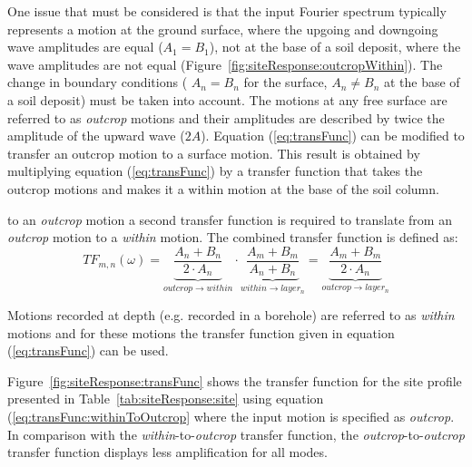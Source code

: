 \documentclass[11pt]{report}
\begin{document}
One issue that must be considered is that the input Fourier spectrum typically represents a motion
at the ground surface, where the upgoing and downgoing wave amplitudes are equal ($A_1=B_1$), not at
the base of a soil deposit, where the wave amplitudes are not equal
(Figure~\ref{fig:siteResponse:outcropWithin}). The change in boundary conditions ( $A_n = B_n$ for
the surface, $A_n \ne B_n$ at the base of a soil deposit) must be taken into account.  The motions
at any free surface are referred to as \emph{outcrop} motions and their
amplitudes are described by twice the amplitude of the upward wave ($2A$).  Equation
(\ref{eq:transFunc}) can be modified to transfer an outcrop motion to a surface motion.  This result
is obtained by multiplying equation (\ref{eq:transFunc}) by a transfer function that takes the
outcrop motions and makes it a within motion at the base of the soil column.

to an \emph{outcrop} motion a second transfer function is required to translate
from an \emph{outcrop} motion to a \emph{within} motion.  The combined transfer function is defined
as:
\begin{equation}
  TF_{m,n}(\omega) = \underbrace{\frac{A_n + B_n}{2\cdot A_n}}_{outcrop \to within} \cdot
  \underbrace{\frac{A_m + B_m}{A_n + B_n}}_{within \to layer_n} = \underbrace{\frac{A_m + B_m}{ 2
  \cdot A_n }}_{outcrop \to layer_n}
  \label{eq:transFunc:withinToOutcrop}
\end{equation}

Motions recorded at depth (e.g. recorded in a borehole) are referred to as
\emph{within} motions and for these motions the transfer function given in
equation (\ref{eq:transFunc}) can be used.  

Figure~\ref{fig:siteResponse:transFunc} shows the transfer function for the site profile presented
in Table~\ref{tab:siteResponse:site} using equation (\ref{eq:transFunc:withinToOutcrop} where the
input motion is specified as \emph{outcrop}. In comparison with the \emph{within}-to-\emph{outcrop}
transfer function, the \emph{outcrop}-to-\emph{outcrop} transfer function displays less
amplification for all modes.
\end{document}
